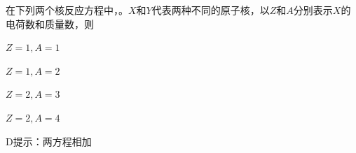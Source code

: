 在下列两个核反应方程中，。\(X\)和\(Y\)代表两种不同的原子核，以\(Z\)和\(A\)分别表示\(X\)的电荷数和质量数，则\paren[]
\begin{choices}
	\item \(Z=1,A=1\)
	\item \(Z=1, A=2\)
	\item \(Z=2,A=3\)
	\item \(Z=2,A=4\)
\end{choices} 
\begin{answer}
	D\qquad 提示：两方程相加
\end{answer}